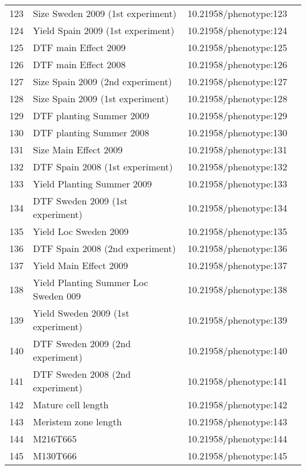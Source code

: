\begin{longtable}{p{} p{} p{} p{}}
 123 & Size Sweden 2009 (1st experiment) & 10.21958/phenotype:123 & \cite{li2010}\\
 124 & Yield Spain 2009 (1st experiment) & 10.21958/phenotype:124 & \cite{li2010}\\
 125 & DTF main Effect 2009 & 10.21958/phenotype:125 & \cite{li2010}\\
 126 & DTF main Effect 2008 & 10.21958/phenotype:126 & \cite{li2010}\\
 127 & Size Spain 2009 (2nd experiment) & 10.21958/phenotype:127 & \cite{li2010}\\
 128 & Size Spain 2009 (1st experiment) & 10.21958/phenotype:128 & \cite{li2010}\\
 129 & DTF planting Summer 2009 & 10.21958/phenotype:129 & \cite{li2010}\\
 130 & DTF planting Summer 2008 & 10.21958/phenotype:130 & \cite{li2010}\\
 131 & Size Main Effect 2009 & 10.21958/phenotype:131 & \cite{li2010}\\
 132 & DTF Spain 2008 (1st experiment) & 10.21958/phenotype:132 & \cite{li2010}\\
 133 & Yield Planting Summer 2009 & 10.21958/phenotype:133 & \cite{li2010}\\
 134 & DTF Sweden 2009 (1st experiment) & 10.21958/phenotype:134 & \cite{li2010}\\
 135 & Yield Loc Sweden 2009 & 10.21958/phenotype:135 & \cite{li2010}\\
 136 & DTF Spain 2008 (2nd experiment) & 10.21958/phenotype:136 & \cite{li2010}\\
 137 & Yield Main Effect 2009 & 10.21958/phenotype:137 & \cite{li2010}\\
 138 & Yield Planting Summer Loc Sweden 009 & 10.21958/phenotype:138 & \cite{li2010}\\
 139 & Yield Sweden 2009 (1st experiment) & 10.21958/phenotype:139 & \cite{li2010}\\
 140 & DTF Sweden 2009 (2nd experiment) & 10.21958/phenotype:140 & \cite{li2010}\\
 141 & DTF Sweden 2008 (2nd experiment) & 10.21958/phenotype:141 & \cite{li2010}\\
 142 & Mature cell length & 10.21958/phenotype:142 & \cite{me2014}\\
 143 & Meristem zone length & 10.21958/phenotype:143 & \cite{me2014}\\
 144 & M216T665 & 10.21958/phenotype:144 & \cite{strauch2015}\\
 145 & M130T666 & 10.21958/phenotype:145 & \cite{strauch2015}\\

\end{longtable}

